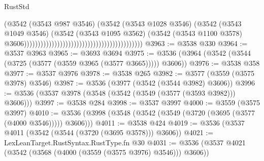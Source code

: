 \begin{lexlean}{RustStd}
\begin{coremodule}
                                                                                (@3542
                                                                                  (@3543 @987 @3546)
                                                                                  (@3542
                                                                                    (@3543
                                                                                      @1028
                                                                                      @3546)
                                                                                    (@3542
                                                                                      (@3543
                                                                                        @1049
                                                                                        @3546)
                                                                                      (@3542
                                                                                        (@3543
                                                                                          @1095
                                                                                          @3562)
                                                                                        (@3542
                                                                                          (@3543
                                                                                            @1100
                                                                                            @3578)
                                                                                          @3606)))))))))))))))))))))))))))))))))))))))))))
@3963 := @3538 @330
@3964 := @3537 @3963
@3965 := @3693 @3694
@3975 := @3536 (@3964 (@3542 (@3544 (@3725 (@3577 (@3559 @3965 (@3577 @3665))))) @3606))
@3976 := @3538 @358
@3977 := @3537 @3976
@3978 := @3538 @265
@3982 := @3577 (@3559 (@3575 @3978) @3546)
@3987 := @3536 (@3977 (@3542 (@3544 @3982) @3606))
@3996 := @3536 (@3537 @3978 (@3548 (@3542 (@3549 (@3577 (@3593 @3982))) @3606)))
@3997 := @3538 @284
@3998 := @3537 @3997
@4000 := @3559 (@3575 @3997)
@4010 := @3536 (@3998 (@3548 (@3542 (@3549 (@3720 (@3695 (@3577 (@4000 @3546))))) @3606)))
@4011 := @3538 @424
@4019 := @3536 (@3537 @4011 (@3542 (@3544 (@3720 (@3695 @3578))) @3606))
@4021 := LexLeanTarget.RustSyntax.RustType.fn @30
@4031 := @3536 (@3537 @4021 (@3542 (@3568 (@4000 (@3559 (@3575 @3976) @3546))) @3606))

\end{coremodule}
\end{lexlean}
